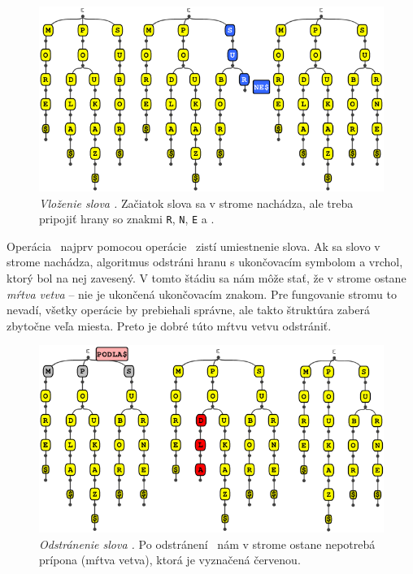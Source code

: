 \begin{figure}
\includegraphics[width=\columnwidth]{obrazky/trieinsertsmall.png}
\caption{\emph{Vloženie slova .} Začiatok slova 
 sa v strome nachádza, ale treba pripojiť hrany 
so znakmi {\tt R}, {\tt N}, {\tt E} a \uz.} 
\label{img:trieinsert} 
\end{figure}

Operácia \delete\ najprv pomocou operácie \find\ zistí umiestnenie slova. 
Ak sa slovo v strome nachádza, algoritmus odstráni hranu s ukončovacím 
symbolom a vrchol, ktorý bol na nej zavesený. V tomto štádiu sa nám môže 
stať, že v strome ostane \emph{mŕtva vetva} -- nie je ukončená 
ukončovacím znakom. Pre fungovanie stromu to nevadí, všetky operácie by 
prebiehali správne, ale takto štruktúra zaberá zbytočne veľa miesta. 
Preto je dobré túto mŕtvu vetvu odstrániť.

\begin{figure}
\includegraphics[width=\columnwidth]{obrazky/triedeletesmall.png}
\caption{\emph{Odstránenie slova .} Po odstránení 
\uz\ nám v strome ostane nepotrebá prípona  (mŕtva vetva), 
ktorá je vyznačená červenou.}
\label{img:triedelete} 
\end{figure}

